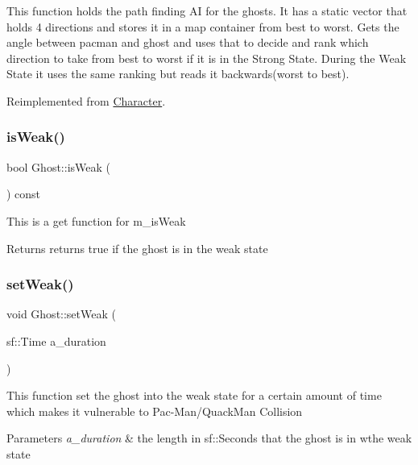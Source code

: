 This function holds the path finding AI for the ghosts. It has a static vector that holds 4 directions and stores it in a map container from best to worst. Gets the angle between pacman and ghost and uses that to decide and rank which direction to take from best to worst if it is in the Strong State. During the Weak State it uses the same ranking but reads it backwards(worst to best). 

Reimplemented from \hyperlink{class_character_ab4c0dc6f72c78607b921cf312e10ed35}{Character}.

\mbox{\label{class_ghost_af0cf8b5a66a4a390746f43238b96fe55}} 
\subsubsection{\texorpdfstring{is\+Weak()}{isWeak()}}
{\footnotesize\ttfamily bool Ghost\+::is\+Weak (\begin{DoxyParamCaption}{ }\end{DoxyParamCaption}) const}

This is a get function for m\+\_\+is\+Weak

\begin{DoxyReturn}{Returns}
returns true if the ghost is in the weak state 
\end{DoxyReturn}
\mbox{\label{class_ghost_ad3af3a46b5c130515dffaae54824341a}} 
\subsubsection{\texorpdfstring{set\+Weak()}{setWeak()}}
{\footnotesize\ttfamily void Ghost\+::set\+Weak (\begin{DoxyParamCaption}\item[{sf\+::\+Time}]{a\+\_\+duration }\end{DoxyParamCaption})}

This function set the ghost into the weak state for a certain amount of time which makes it vulnerable to Pac-\/\+Man/\+Quack\+Man Collision


\begin{DoxyParams}{Parameters}
{\em a\+\_\+duration} & the length in sf\+::\+Seconds that the ghost is in wthe weak state \\
\hline
\end{DoxyParams}
\mbox{\label{class_ghost_a164e0607f7ea0d72d756bdf964e66b90}} 
